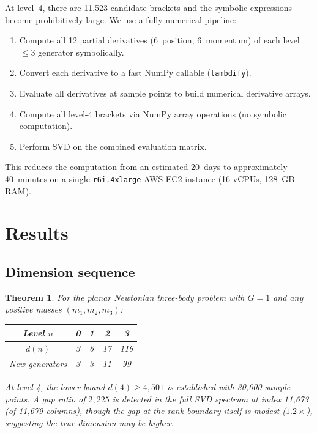 \documentclass[11pt,a4paper]{article}
\newtheorem{theorem}{Theorem}
\theoremstyle{remark}
\begin{document}
At level~4, there are 11,523 candidate brackets and the symbolic
expressions become prohibitively large.  We use a fully numerical
pipeline:
\begin{enumerate}[nosep]
  \item Compute all 12 partial derivatives (6~position,
        6~momentum) of each level~$\le 3$ generator symbolically.
  \item Convert each derivative to a fast NumPy callable
        (\texttt{lambdify}).
  \item Evaluate all derivatives at sample points to build
        numerical derivative arrays.
  \item Compute all level-4 brackets via NumPy array operations
        (no symbolic computation).
  \item Perform SVD on the combined evaluation matrix.
\end{enumerate}
This reduces the computation from an estimated 20~days to
approximately 40~minutes on a single \texttt{r6i.4xlarge}
AWS EC2 instance (16 vCPUs, 128~GB RAM).


\section{Results}

\subsection{Dimension sequence}

\begin{theorem}\label{thm:dims}
For the planar Newtonian three-body problem with
$G=1$ and any positive masses $(m_1, m_2, m_3)$:
\begin{center}
\begin{tabular}{@{}ccccc@{}}
\toprule
Level $n$ & 0 & 1 & 2 & 3 \\
\midrule
$d(n)$ & 3 & 6 & 17 & 116 \\
New generators & 3 & 3 & 11 & 99 \\
\bottomrule
\end{tabular}
\end{center}
At level 4, the lower bound $d(4) \ge 4{,}501$ is established
with 30,000 sample points.  A gap ratio of $2{,}225$ is detected
in the full SVD spectrum at index 11,673 (of 11,679 columns),
though the gap at the rank boundary itself is modest ($1.2\times$),
suggesting the true dimension may be higher.
\end{theorem}
\end{document}
